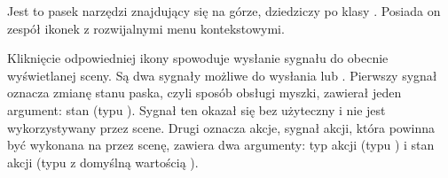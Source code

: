 
\par
Jest to pasek narzędzi znajdujący się na górze, dziedziczy po klasy .
Posiada on zespół ikonek z rozwijalnymi menu kontekstowymi.

\par
Kliknięcie odpowiedniej ikony spowoduje wysłanie sygnału do obecnie wyświetlanej sceny.
Są dwa sygnały możliwe do wysłania  lub .
Pierwszy sygnał oznacza zmianę stanu paska, czyli sposób obsługi myszki, zawierał jeden argument: stan (typu ).
Sygnał ten okazał się bez użyteczny i nie jest wykorzystywany przez scene.
Drugi oznacza akcje, sygnał akcji, która powinna być wykonana na przez scenę, zawiera dwa argumenty: typ akcji (typu ) i stan akcji (typu  z domyślną wartością ).

